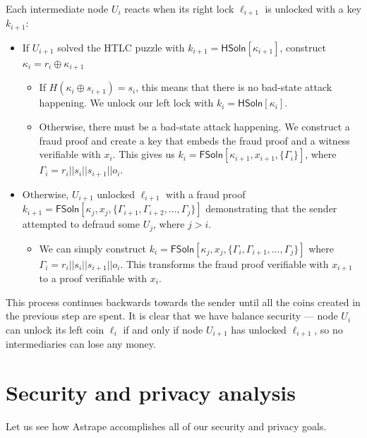 \documentclass[USenglish,oneside,twocolumn]{article}
\begin{document}
Each intermediate node $U_i$ reacts when its right lock $\ell_{i+1}$ is unlocked with a key $k_{i+1}$:

\begin{itemize}
    \item If $U_{i+1}$ solved the HTLC puzzle with $k_{i+1} = \mathsf{HSoln}[\kappa_{i+1}]$, construct $\kappa_i = r_i \oplus \kappa_{i+1}$
          \begin{itemize}
              \item If $H(\kappa_i \oplus s_{i+1}) = s_i$, this means that there is no bad-state attack happening. We unlock our left lock with $k_i = \mathsf{HSoln}[\kappa_i]$.
              \item Otherwise, there must be a bad-state attack happening. We construct a fraud proof and create a key that embeds the fraud proof and a witness verifiable with $x_i$. This gives us $k_i = \mathsf{FSoln}[\kappa_{i+1}, x_{i+1}, \{ \Gamma_i \}]$, where $\Gamma_i = r_i||s_i||s_{i+1}||o_i$.
          \end{itemize}
    \item Otherwise, $U_{i+1}$ unlocked $\ell_{i+1}$ with a fraud proof $k_{i+1} = \mathsf{FSoln}[\kappa_{j}, x_j, \{ \Gamma_{i+1}, \Gamma_{i+2}, \dots, \Gamma_j \}]$ demonstrating that the sender attempted to defraud some $U_j$, where $j>i$.
          \begin{itemize}
              \item We can simply construct $k_i = \mathsf{FSoln}[\kappa_j, x_j, \{ \Gamma_i, \Gamma_{i+1}, \dots, \Gamma_j \}]$ where $\Gamma_i = r_i||s_i||s_{i+1}||o_i$. This transforms the fraud proof verifiable with $x_{i+1}$ to a proof verifiable with $x_i$.
          \end{itemize}
\end{itemize}

This process continues backwards towards the sender until all the coins created in the previous step are spent. It is clear that we have balance security --- node $U_i$ can unlock its left coin $\ell_i$ if and only if node $U_{i+1}$ has unlocked $\ell_{i+1}$, so no intermediaries can lose any money.

\section{Security and privacy analysis} \label{sec:secpriv}

Let us see how Astrape accomplishes all of our security and privacy goals.
\end{document}
